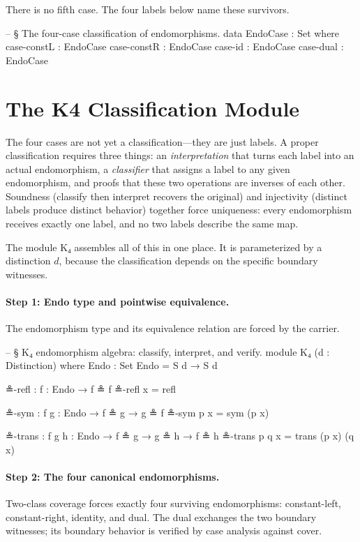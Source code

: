 \documentclass[11pt,a4paper]{book}
\def\texttt#1{#1}%
\def\texorpdfstring#1#2{#2}%
\begin{document}
There is no fifth case. The four labels below name these survivors.

\begin{code}
-- § The four-case classification of endomorphisms.
data EndoCase : Set where
  case-constL : EndoCase
  case-constR : EndoCase
  case-id     : EndoCase
  case-dual   : EndoCase
\end{code}

\section{The \texorpdfstring{$K_4$}{K4} Classification Module}

The four cases are not yet a classification—they are just labels. A proper classification requires three things: an \textit{interpretation} that turns each label into an actual endomorphism, a \textit{classifier} that assigns a label to any given endomorphism, and proofs that these two operations are inverses of each other. Soundness (classify then interpret recovers the original) and injectivity (distinct labels produce distinct behavior) together force uniqueness: every endomorphism receives exactly one label, and no two labels describe the same map.

The module \texttt{K₄} assembles all of this in one place. It is parameterized by a distinction $d$, because the classification depends on the specific boundary witnesses.

\paragraph{Step 1: Endo type and pointwise equivalence.}
The endomorphism type and its equivalence relation are forced by the carrier.

\begin{code}
-- § K₄ endomorphism algebra: classify, interpret, and verify.
module K₄ (d : Distinction) where
  Endo : Set
  Endo = S d → S d

  ≗-refl : {f : Endo} → f ≗ f
  ≗-refl x = refl

  ≗-sym : {f g : Endo} → f ≗ g → g ≗ f
  ≗-sym p x = sym (p x)

  ≗-trans : {f g h : Endo} → f ≗ g → g ≗ h → f ≗ h
  ≗-trans p q x = trans (p x) (q x)
\end{code}

\paragraph{Step 2: The four canonical endomorphisms.}
Two-class coverage forces exactly four surviving endomorphisms: constant-left, constant-right, identity, and dual.
The dual exchanges the two boundary witnesses; its boundary behavior is verified by case analysis against \texttt{cover}.
\end{document}
